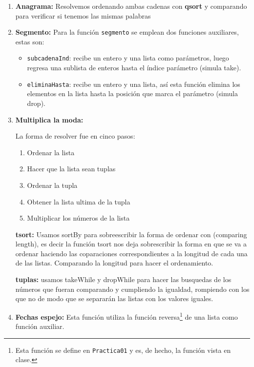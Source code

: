 \documentclass{article}
\newcommand{\code}[1]{\textcolor{white!25!black}{\texttt{#1}}}
\begin{document}
\begin{enumerate}
  
\item \textbf{Anagrama:} Resolvemos ordenando ambas cadenas con \textbf{qsort} y comparando para verificar si tenemos las mismas palabras
  
\item \textbf{Segmento:} Para la función \code{segmento} se emplean dos funciones
  auxiliares, estas son:
  \begin{itemize}
  \item \code{subcadenaInd}: recibe un entero y una lista como parámetros, luego
    regresa una sublista de enteros hasta el índice parámetro (simula take).
  \item \code{eliminaHasta}: recibe un entero y una lista, así esta función elimina
    los elementos en la lista hasta la posición que marca el parámetro (simula drop).
  \end{itemize}
\item \textbf{Multiplica la moda:}

La forma de resolver fue en cinco pasos:
\begin{enumerate}
    \item Ordenar la lista
    \item Hacer que la lista sean tuplas
    \item Ordenar la tupla
    \item Obtener la lista ultima de la tupla 
    \item Multiplicar los números de la lista
\end{enumerate}

\textbf{tsort:} Usamos sortBy para sobreescribir la forma de ordenar con (comparing length), es decir la función tsort nos deja sobrescribir la forma en que se va a ordenar haciendo las coparaciones correspondientes a la longitud de cada una de las listas. Comparando la longitud para hacer el ordenamiento. 

\textbf{tuplas:} usamos takeWhile y dropWhile para hacer las busquedas
 de los números que fueran comparando y cumpliendo la igualdad, rompiendo 
 con los que no de modo que se separarán las listas con los valores iguales. 
  
\item \textbf{Fechas espejo:} Esta función utiliza la función reversa\footnote{Esta
función se define en \code{Practica01} y es, de hecho, la función vista en clase.}
  de una lista como función auxiliar.
  

\end{enumerate}
\end{document}
